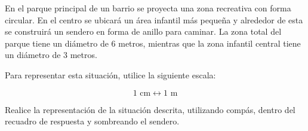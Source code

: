 En el parque principal de un barrio se proyecta una zona recreativa con forma circular. En el centro se ubicará un área infantil más pequeña y alrededor de esta se construirá un sendero en forma de anillo para caminar. La zona total del parque tiene un diámetro de 6 metros, mientras que la zona infantil central tiene un diámetro de 3 metros.

Para representar esta situación, utilice la siguiente escala:

\[
1 \text{ cm} \leftrightarrow 1 \text{ m}
\]

Realice la representación de la situación descrita, utilizando compás, dentro del recuadro de respuesta y sombreando el sendero.